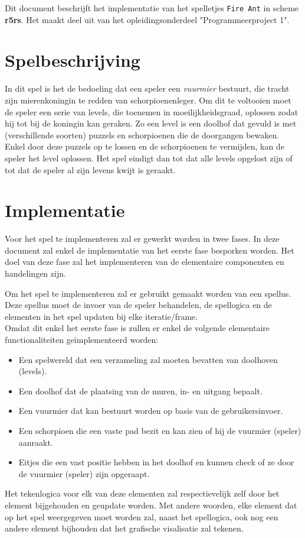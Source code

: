 Dit document beschrijft het implementatie van het spelletjes \texttt{Fire Ant} in scheme \textbf{r5rs}.
Het maakt deel uit van het opleidingsonderdeel "Programmeerproject 1".

\section{Spelbeschrijving}

In dit spel is het de bedoeling dat een speler een \textit{vuurmier} bestuurt, die tracht zijn mierenkoningin te redden van schorpioenenleger.
Om dit te voltooien moet de speler een serie van levels, die toenemen in moeilijkheidsgraad, oplossen zodat hij tot bij de koningin kan geraken.
Zo een level is een doolhof dat gevuld is met (verschillende soorten) puzzels en schorpioenen die de doorgangen bewaken.
Enkel door deze puzzels op te lossen en de schorpioenen te vermijden, kan de speler het level oplossen.
Het spel eindigt dan tot dat alle levels opgelost zijn of tot dat de speler al zijn levens kwijt is geraakt.

\section{Implementatie}

Voor het spel te implementeren zal er gewerkt worden in twee fases.
In deze document zal enkel de implementatie van het eerste fase besporken worden.
Het doel van deze fase zal het implementeren van de elementaire componenten en handelingen zijn.

Om het spel te implementeren zal er gebruikt gemaakt worden van een spellus.
Deze spellus moet de invoer van de speler behandelen, de spellogica en de elementen in het spel updaten bij elke iteratie/frame.\\
Omdat dit enkel het eerste fase is zullen er enkel de volgende elementaire functionaliteiten ge\"implementeerd worden:

\begin{itemize}
	\item Een spelwereld dat een verzameling zal moeten bevatten van doolhoven (levels).
	\item Een doolhof dat de plaatsing van de muren, in- en uitgang bepaalt.
	\item Een vuurmier dat kan bestuurt worden op basis van de gebruikersinvoer.
	\item Een schorpioen die een vaste pad bezit en kan zien of hij de vuurmier (speler) aanraakt.
	\item Eitjes die een vast positie hebben in het doolhof en kunnen check of ze door de vuurmier (speler) zijn opgeraapt.
\end{itemize}

Het tekenlogica voor elk van deze elementen zal respectievelijk zelf door het element bijgehouden en geupdate worden.
Met andere woorden, elke element dat op het spel weergegeven moet worden zal, naast het spellogica, ook nog een andere element bijhouden dat het grafische visalisatie zal tekenen.

